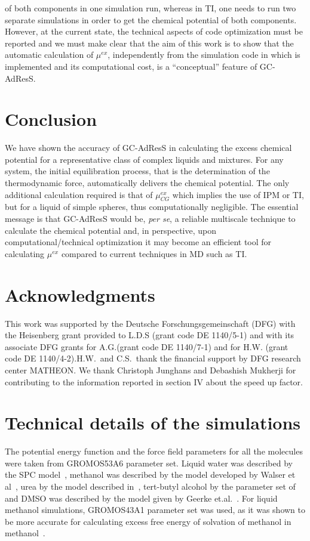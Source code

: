 \documentclass[a4paper,preprint,unsortedaddress]{revtex4-1}
\newcommand{\recheck}[1]{{\color{red} #1}}
\begin{document}
of both components in one simulation run, whereas in TI, one needs to run two separate simulations in order to get the chemical potential of both components.
However, at the current state, the technical aspects of code optimization must be reported and we must make clear that the aim of this work is to show that  the automatic calculation of $\mu^{ex}$, independently from the simulation code in which is implemented and its computational cost, is a ``conceptual'' feature of GC-AdResS.
  
\section{Conclusion} 
We have shown the accuracy of GC-AdResS in calculating the excess chemical potential for a representative class of complex liquids and mixtures. 
For any system, the initial equilibration process, that is the determination of the thermodynamic force, automatically delivers the chemical potential. The only additional calculation required is that of $\mu^{ex}_{CG}$ which implies the use of IPM or TI, but for a liquid of simple spheres, thus computationally negligible.  
The essential message is that GC-AdResS would be, {\it per se}, a reliable multiscale technique to calculate the chemical potential and, in perspective, upon computational/technical optimization it may become an efficient tool for calculating $\mu^{ex}$ compared to current techniques in MD such as TI. 

\section*{Acknowledgments}
This work was supported by the Deutsche Forschungsgemeinschaft (DFG) with the Heisenberg grant provided to L.D.S (grant code DE 1140/5-1) and with its associate DFG grants for A.G.(grant code DE 1140/7-1) and for H.W. (grant code DE 1140/4-2).H.W.~and C.S.~thank the financial support by DFG research center MATHEON. \recheck{We thank Christoph Junghans and Debashish Mukherji for contributing to the information reported in section IV about the speed up factor}.

\appendix
\section{Technical details of the simulations}\label{app:tmp1}
The potential energy function and the force field parameters for all the molecules
were taken from GROMOS53A6 parameter set. Liquid water was described by the SPC
model~\cite{spc}, methanol was described by the model developed by Walser et al~\cite{walser},
urea by the model described in~\cite{urea}, tert-butyl alcohol by the parameter set of~\cite{tba}
and DMSO was described by the model given by Geerke et.al.~\cite{dmso1}. For liquid methanol simulations, 
GROMOS43A1 parameter set was used, as it was shown to be more accurate for calculating excess free energy of 
solvation of methanol in methanol~\cite{vang}. 
\end{document}
